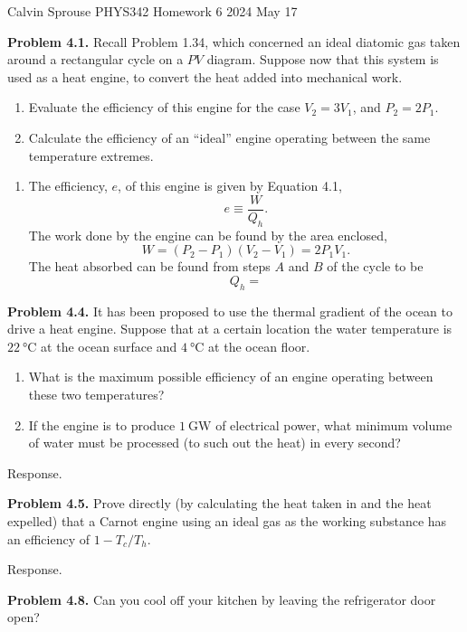 \documentclass[a4paper, 12pt]{config/homework}
\begin{document}
\noindent
Calvin Sprouse \hfill PHYS342 Homework 6 \hfill 2024 May 17

\bigskip
\noindent
\textbf{Problem 4.1.} Recall Problem 1.34, which concerned an ideal diatomic gas taken around a rectangular cycle on a \(PV\) diagram. Suppose now that this system is used as a heat engine, to convert the heat added into mechanical work.
\begin{enumerate}[label=\textbf{(\alph*)}]
\item Evaluate the efficiency of this engine for the case \(V_2 = 3V_1\), and \(P_2 = 2P_1\).
\item Calculate the efficiency of an ``ideal'' engine operating between the same temperature extremes.
\end{enumerate}
\begin{enumerate}[label=\textbf{(\alph*)}]
\item The efficiency, \(e\), of this engine is given by Equation 4.1,
\[e \equiv \frac{W}{Q_h}.\]
The work done by the engine can be found by the area enclosed,
\[W = \left(P_2 - P_1\right)\left(V_2 - V_1\right) = 2 P_1 V_1.\]
The heat absorbed can be found from steps \(A\) and \(B\) of the cycle to be
\[Q_h = \]
\end{enumerate}

\pagebreak
\noindent
\textbf{Problem 4.4.} It has been proposed to use the thermal gradient of the ocean to drive a heat engine. Suppose that at a certain location the water temperature is \(\qty{22}{\celsius}\) at the ocean surface and \(\qty{4}{\celsius}\) at the ocean floor.
\begin{enumerate}[label=\textbf{(\alph*)}]
\item What is the maximum possible efficiency of an engine operating between these two temperatures?
\item If the engine is to produce \(\qty{1}{\giga\watt}\) of electrical power, what minimum volume of water must be processed (to such out the heat) in every second?
\end{enumerate}
\noindent
Response.

\pagebreak
\noindent
\textbf{Problem 4.5.} Prove directly (by calculating the heat taken in and the heat expelled) that a Carnot engine using an ideal gas as the working substance has an efficiency of \(1 - T_c/T_h\).

\bigskip
\noindent
Response.

\pagebreak
\noindent
\textbf{Problem 4.8.} Can you cool off your kitchen by leaving the refrigerator door open?
\end{document}
